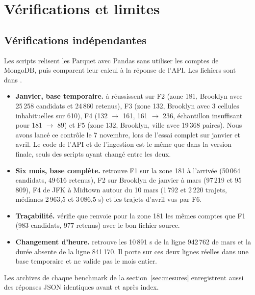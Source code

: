 \section{Vérifications et limites}\label{sec:verifications}
\subsection{Vérifications indépendantes}
Les scripts relisent les Parquet avec Pandas sans utiliser les comptes de MongoDB, puis comparent
leur calcul à la réponse de l'API. Les fichiers sont dans .
\begin{itemize}
\item \textbf{Janvier, base temporaire.}  à  réussissent
sur F2 (zone 181, Brooklyn avec 25\,258 candidats et 24\,860 retenus), F3 (zone 132, Brooklyn avec
3 cellules inhabituelles sur 610), F4 (132 $\to$ 161, 161 $\to$ 236, échantillon insuffisant pour
181 $\to$ 89) et F5 (zone 132, Brooklyn, ville avec 19\,368 paires). Nous avons lancé ce contrôle le 7 novembre, lors de l'essai complet sur janvier et avril. Le code de l'API et de l'ingestion est
le même que dans la version finale, seuls des scripts ayant changé entre les deux.
\item \textbf{Six mois, base complète.}  retrouve F1 sur la zone
181 à l'arrivée (50\,064 candidats, 49\,616 retenus), F2 sur Brooklyn de janvier à mars (97\,219 et
95\,809), F4 de JFK à Midtown autour du 10 mars (1\,792 et 2\,220 trajets, médianes 2\,963,5 et
3\,086,5 s) et les trajets d'avril vus par F6.
\item \textbf{Traçabilité.}  vérifie que  renvoie pour la zone
181 les mêmes comptes que F1 (983 candidats, 977 retenus) avec le bon fichier source.
\item \textbf{Changement d'heure.}  retrouve les 10\,891 s de la ligne
942\,762 de mars et la durée absente de la ligne 841\,170. Il porte sur ces deux lignes réelles
dans une base temporaire et ne valide pas le mois entier.
\end{itemize}
Les archives de chaque benchmark de la section~\ref{sec:mesures} enregistrent aussi des réponses
JSON identiques avant et après index.


